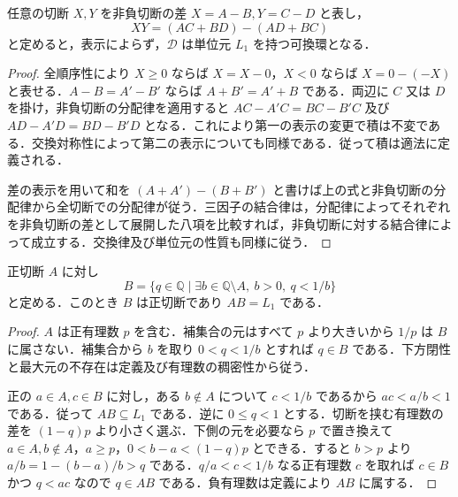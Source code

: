 \begin{prop}[切断上の環構造]
任意の切断 $X,Y$ を非負切断の差 $X=A-B,Y=C-D$ と表し，
\[
 XY=(AC+BD)-(AD+BC)
\]
と定めると，表示によらず，$\mathcal D$ は単位元 $L_1$ を持つ可換環となる．
\end{prop}
\begin{proof}
全順序性により $X\geq0$ ならば $X=X-0$，$X<0$ ならば $X=0-(-X)$ と表せる．$A-B=A'-B'$ ならば $A+B'=A'+B$ である．両辺に $C$ 又は $D$ を掛け，非負切断の分配律を適用すると $AC-A'C=BC-B'C$ 及び $AD-A'D=BD-B'D$ となる．これにより第一の表示の変更で積は不変である．交換対称性によって第二の表示についても同様である．従って積は適法に定義される．

差の表示を用いて和を $(A+A')-(B+B')$ と書けば上の式と非負切断の分配律から全切断での分配律が従う．三因子の結合律は，分配律によってそれぞれを非負切断の差として展開した八項を比較すれば，非負切断に対する結合律によって成立する．交換律及び単位元の性質も同様に従う．
\end{proof}
\begin{prop}[正切断の乗法逆元]
正切断 $A$ に対し
\[
 B=\{q\in\mathbb Q\mid \exists b\in\mathbb Q\setminus A,\ b>0,\ q<1/b\}
\]
と定める．このとき $B$ は正切断であり $AB=L_1$ である．
\end{prop}
\begin{proof}
$A$ は正有理数 $p$ を含む．補集合の元はすべて $p$ より大きいから $1/p$ は $B$ に属さない．補集合から $b$ を取り $0<q<1/b$ とすれば $q\in B$ である．下方閉性と最大元の不存在は定義及び有理数の稠密性から従う．

正の $a\in A,c\in B$ に対し，ある $b\notin A$ について $c<1/b$ であるから $ac<a/b<1$ である．従って $AB\subseteq L_1$ である．逆に $0\leq q<1$ とする．切断を挟む有理数の差を $(1-q)p$ より小さく選ぶ．下側の元を必要なら $p$ で置き換えて $a\in A,b\notin A$，$a\geq p$，$0<b-a<(1-q)p$ とできる．すると $b>p$ より $a/b=1-(b-a)/b>q$ である．$q/a<c<1/b$ なる正有理数 $c$ を取れば $c\in B$ かつ $q<ac$ なので $q\in AB$ である．負有理数は定義により $AB$ に属する．
\end{proof}
